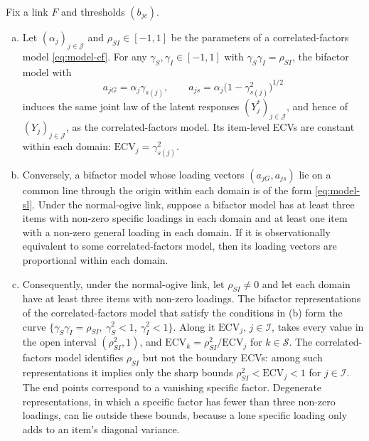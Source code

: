 \begin{proposition}\label{prop:model-sl}
Fix a link $F$ and thresholds $(b_{jc})$.
\begin{enumerate}[(a)]
  \item Let $(\alpha_j)_{j\in\mathcal J}$ and $\rho_{SI}\in[-1,1]$ be the parameters of a correlated-factors model \eqref{eq:model-cf}. For any $\gamma_S,\gamma_I\in[-1,1]$ with $\gamma_S\gamma_I=\rho_{SI}$, the bifactor model with
  \begin{equation}\label{eq:model-sl}
    a_{jG}=\alpha_j\gamma_{s(j)},\qquad a_{js}=\alpha_j\bigl(1-\gamma_{s(j)}^2\bigr)^{1/2}
  \end{equation}
  induces the same joint law of the latent responses $(Y^*_j)_{j\in\mathcal J}$, and hence of $(Y_j)_{j\in\mathcal J}$, as the correlated-factors model. Its item-level ECVs are constant within each domain: $\mathrm{ECV}_j=\gamma^2_{s(j)}$.
  \item Conversely, a bifactor model whose loading vectors $(a_{jG},a_{js})$ lie on a common line through the origin within each domain is of the form \eqref{eq:model-sl}. Under the normal-ogive link, suppose a bifactor model has at least three items with non-zero specific loadings in each domain and at least one item with a non-zero general loading in each domain. If it is observationally equivalent to some correlated-factors model, then its loading vectors are proportional within each domain.
  \item Consequently, under the normal-ogive link, let $\rho_{SI}\neq0$ and let each domain have at least three items with non-zero loadings. The bifactor representations of the correlated-factors model that satisfy the conditions in (b) form the curve $\{\gamma_S\gamma_I=\rho_{SI},\ \gamma_S^2<1,\ \gamma_I^2<1\}$. Along it $\mathrm{ECV}_j$, $j\in\mathcal I$, takes every value in the open interval $(\rho_{SI}^2,1)$, and $\mathrm{ECV}_k=\rho_{SI}^2/\mathrm{ECV}_j$ for $k\in\mathcal S$. The correlated-factors model identifies $\rho_{SI}$ but not the boundary ECVs: among such representations it implies only the sharp bounds $\rho_{SI}^2<\mathrm{ECV}_j<1$ for $j\in\mathcal I$. The end points correspond to a vanishing specific factor. Degenerate representations, in which a specific factor has fewer than three non-zero loadings, can lie outside these bounds, because a lone specific loading only adds to an item's diagonal variance.
\end{enumerate}
\end{proposition}

